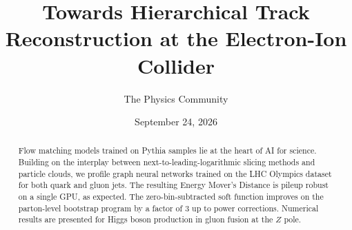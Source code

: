 \documentclass[11pt]{article}
\title{Towards Hierarchical Track Reconstruction at the Electron-Ion Collider}
\author{The Physics Community}
\date{September 24, 2026}
\numberwithin{equation}{section}
\theoremstyle{definition}
\theoremstyle{remark}
\begin{document}
\maketitle
\begin{abstract}
Flow matching models trained on Pythia samples lie at the heart of AI
for science. Building on the interplay between
next-to-leading-logarithmic slicing methods and particle clouds, we
profile graph neural networks trained on the LHC Olympics dataset for
both quark and gluon jets. The resulting Energy Mover's Distance is
pileup robust on a single GPU, as expected. The zero-bin-subtracted soft
function improves on the parton-level bootstrap program by a factor of 3
up to power corrections. Numerical results are presented for Higgs boson
production in gluon fusion at the $Z$ pole.
\end{abstract}
\tableofcontents





\nocite{*}


\end{document}
